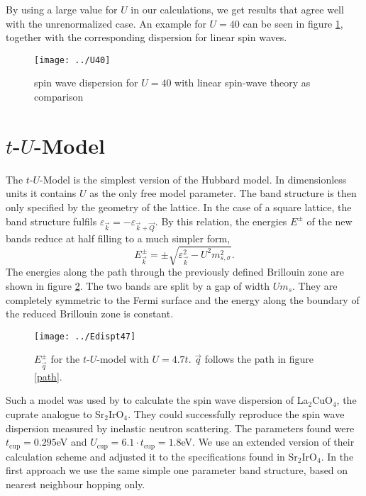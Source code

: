 By using a large value for $U$ in our calculations, we get results that agree well with the unrenormalized case.
An example for $U=40$ can be seen in figure \ref{largeU}, together with the corresponding dispersion for linear spin waves.
%
\begin{figure}
 \begin{center}
  \texttt{[image: ../U40]}
  \caption{spin wave dispersion for $U=40$ with linear spin-wave theory as comparison}
 \label{largeU}
  \end{center}
\end{figure}
%
  
\newpage

\section{$t$-$U$-Model}

The $t$-$U$-Model is the simplest version of the Hubbard model.
In dimensionless units it contains $U$ as the only free model parameter.
The band structure is then only specified by the geometry of the lattice.
In the case of a square lattice, the band structure fulfils $\varepsilon_{\vec k} = -\varepsilon_{\vec k+\vec Q}$.
By this relation, the energies $E^{\pm}$ of the new bands reduce at half filling to a much simpler form,
\begin{equation}
 E^{\pm}_{\vec k} = \pm \sqrt{\varepsilon_{\vec k}^2 -U^2m_{s,\sigma}^2}.
\end{equation}
The energies along the path through the previously defined Brillouin zone are shown in figure \ref{Epmt47}.
The two bands are split by a gap of width $Um_s$. 
They are completely symmetric to the Fermi surface and the energy along the boundary of the reduced Brillouin zone is constant.
%
\begin{figure}
 \centering
 \texttt{[image: ../Edispt47]}
 \caption{$E^{\pm}_{\vec q}$ for the $t$-$U$-model with $U=4.7t$. $\vec q$ follows the path in figure \ref{path}. }
 \label{Epmt47}
\end{figure}


Such a model was used by \citet{PhysRevB.65.132404} to calculate the spin wave dispersion of La$_2$CuO$_4$, the cuprate analogue to Sr$_2$IrO$_4$.
They could successfully reproduce the spin wave dispersion measured by inelastic neutron scattering. 
The parameters found were $t_{\mathrm{cup}}=0.295$eV and $U_{\mathrm{cup}}=6.1\cdot t_{\mathrm{cup}}=1.8$eV. 
We use an extended version of their calculation scheme and adjusted it to the specifications found in Sr$_2$IrO$_4$.
In the first approach we  use the same simple one parameter band structure, based on nearest neighbour hopping only.

